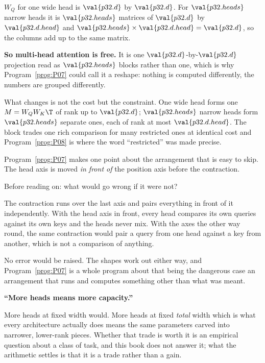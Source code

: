 \begin{fr}

$W_Q$ for one wide head is $\val{p32.d}$ by $\val{p32.d}$. For
$\val{p32.heads}$ narrow heads it is $\val{p32.heads}$ matrices of
$\val{p32.d}$ by $\val{p32.d.head}$ \dash{} and
$\val{p32.heads} \times \val{p32.d.head} = \val{p32.d}$, so the columns
add up to the same matrix.

\textbf{So multi-head attention is free.} It is one $\val{p32.d}$-by-$\val{p32.d}$
projection read as $\val{p32.heads}$ blocks rather than one, which is why
Program~\ref{prog:P07} could call it a reshape: nothing is computed
differently, the numbers are grouped differently.

What changes is not the cost but the constraint. One wide head forms one
$M = W_Q W_K\T$ of rank up to $\val{p32.d}$; $\val{p32.heads}$ narrow heads
form $\val{p32.heads}$ separate ones, each of rank at most
$\val{p32.d.head}$. The block trades one rich comparison for many restricted
ones at identical cost \dash{} and Program~\ref{prog:P08} is where the word
\enquote{restricted} was made precise.

Program~\ref{prog:P07} makes one point about the arrangement that is easy
to skip. The head axis is moved \emph{in front of} the position axis before
the contraction.

Before reading on: what would go wrong if it were not?
\dotline
\nextframe
\end{fr}

\begin{fr}

The contraction runs over the last axis and pairs everything in front of it
independently. With the head axis in front, every head compares its own
queries against its own keys and the heads never mix. With the axes the other
way round, the same contraction would pair a query from one head against a
key from another, which is not a comparison of anything.

No error would be raised. The shapes work out either way, and
Program~\ref{prog:P07} is a whole program about that being the dangerous
case \dash{} an arrangement that runs and computes something other than what
was meant.

\begin{trapbox}
\textbf{\enquote{More heads means more capacity.}}

More heads at fixed width would. More heads at fixed \emph{total} width
\dash{} which is what every architecture actually does \dash{} means the
same parameters carved into narrower, lower-rank pieces. Whether that trade
is worth it is an empirical question about a class of task, and this book
does not answer it; what the arithmetic settles is that it is a trade rather
than a gain.
\end{trapbox}
\end{fr}

